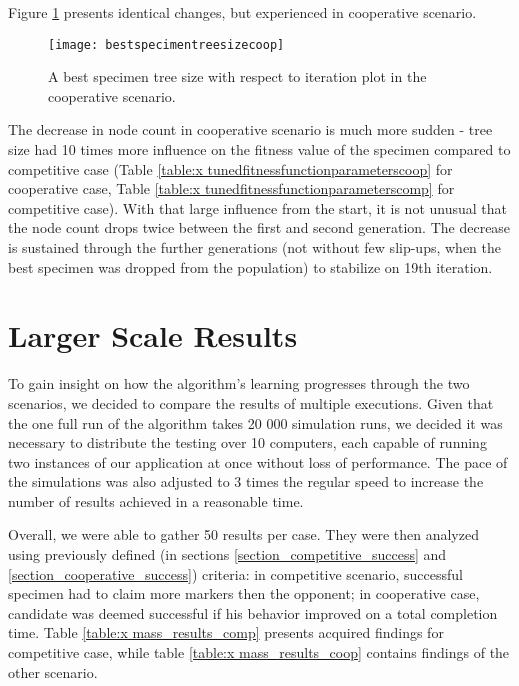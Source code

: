 Figure \ref{fig:x cooperativebestspecimentreesizeplot} presents identical changes, but experienced in cooperative scenario.
\begin{figure}[h]
    \centering
    \texttt{[image: bestspecimentreesizecoop]}
    \caption{A best specimen tree size with respect to iteration plot in the cooperative scenario.}
    \label{fig:x cooperativebestspecimentreesizeplot}
\end{figure}
The decrease in node count in cooperative scenario is much more sudden - tree size had 10 times more influence on the fitness value of the specimen compared to competitive case (Table \ref{table:x tunedfitnessfunctionparameterscoop} for cooperative case, Table \ref{table:x tunedfitnessfunctionparameterscomp} for competitive case). With that large influence from the start, it is not unusual that the node count drops twice between the first and second generation. The decrease is sustained through the further generations (not without few slip-ups, when the best specimen was dropped from the population) to stabilize on 19th iteration.
\section{ Larger Scale Results } %
To gain insight on how the algorithm's learning progresses through the two scenarios, we decided to compare the results of multiple executions. Given that the one full run of the algorithm takes 20 000 simulation runs, we decided it was necessary to distribute the testing over 10 computers, each capable of running two instances of our application at once without loss of performance. The pace of the simulations was also adjusted to 3 times the regular speed to increase the number of results achieved in a reasonable time.

Overall, we were able to gather 50 results per case. They were then analyzed using previously defined (in sections \ref{section_competitive_success} and \ref{section_cooperative_success}) criteria: in competitive scenario, successful specimen had to claim more markers then the opponent; in cooperative case, candidate was deemed successful if his behavior improved on a total completion time. Table \ref{table:x mass_results_comp} presents acquired findings for competitive case, while table \ref{table:x mass_results_coop} contains findings of the other scenario.

